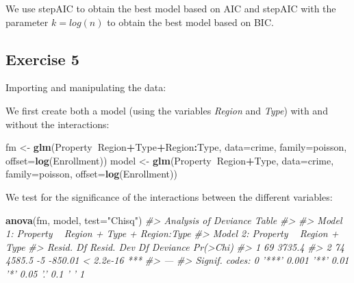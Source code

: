 \documentclass[]{article}
\newenvironment{Shaded}{\begin{snugshade}}{\end{snugshade}}
\newcommand{\CommentTok}[1]{\textcolor[rgb]{0.56,0.35,0.01}{\textit{#1}}}
\newcommand{\DataTypeTok}[1]{\textcolor[rgb]{0.13,0.29,0.53}{#1}}
\newcommand{\KeywordTok}[1]{\textcolor[rgb]{0.13,0.29,0.53}{\textbf{#1}}}
\newcommand{\NormalTok}[1]{#1}
\newcommand{\OperatorTok}[1]{\textcolor[rgb]{0.81,0.36,0.00}{\textbf{#1}}}
\newcommand{\OtherTok}[1]{\textcolor[rgb]{0.56,0.35,0.01}{#1}}
\newcommand{\StringTok}[1]{\textcolor[rgb]{0.31,0.60,0.02}{#1}}
\begin{document}
We use stepAIC to obtain the best model based on AIC and stepAIC with
the parameter \(k=log(n)\) to obtain the best model based on BIC.

\hypertarget{exercise-5}{%
\subsection{Exercise 5}\label{exercise-5}}

Importing and manipulating the data:

\begin{Shaded}
\end{Shaded}

We first create both a model (using the variables \emph{Region} and
\emph{Type}) with and without the interactions:

\begin{Shaded}
\begin{Highlighting}[]
\NormalTok{fm <-}\StringTok{ }\KeywordTok{glm}\NormalTok{(Property}\OperatorTok{~}\NormalTok{Region}\OperatorTok{+}\NormalTok{Type}\OperatorTok{+}\NormalTok{Region}\OperatorTok{:}\NormalTok{Type, }\DataTypeTok{data=}\NormalTok{crime, }\DataTypeTok{family=}\NormalTok{poisson, }\DataTypeTok{offset=}\KeywordTok{log}\NormalTok{(Enrollment))}
\NormalTok{model <-}\StringTok{ }\KeywordTok{glm}\NormalTok{(Property}\OperatorTok{~}\NormalTok{Region}\OperatorTok{+}\NormalTok{Type, }\DataTypeTok{data=}\NormalTok{crime, }\DataTypeTok{family=}\NormalTok{poisson, }\DataTypeTok{offset=}\KeywordTok{log}\NormalTok{(Enrollment))}
\end{Highlighting}
\end{Shaded}

We test for the significance of the interactions between the different
variables:

\begin{Shaded}
\begin{Highlighting}[]
\KeywordTok{anova}\NormalTok{(fm, model, }\DataTypeTok{test=}\StringTok{"Chisq"}\NormalTok{)}
\CommentTok{#> Analysis of Deviance Table}
\CommentTok{#> }
\CommentTok{#> Model 1: Property ~ Region + Type + Region:Type}
\CommentTok{#> Model 2: Property ~ Region + Type}
\CommentTok{#>   Resid. Df Resid. Dev Df Deviance  Pr(>Chi)    }
\CommentTok{#> 1        69     3735.4                          }
\CommentTok{#> 2        74     4585.5 -5  -850.01 < 2.2e-16 ***}
\CommentTok{#> ---}
\CommentTok{#> Signif. codes:  0 '***' 0.001 '**' 0.01 '*' 0.05 '.' 0.1 ' ' 1}
\end{Highlighting}
\end{Shaded}
\end{document}
